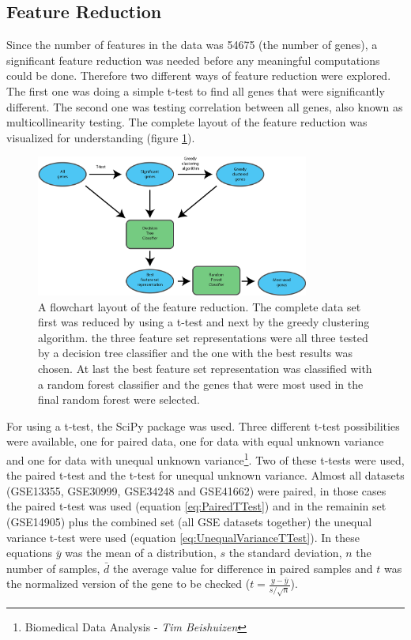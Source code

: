 \documentclass[10pt,a4paper]{article}
\begin{document}
	\subsection{Feature Reduction}
	\label{subsec:MethodsFeatureReduction}
	
	Since the number of features in the data was 54675 (the number of genes), a significant feature reduction was needed before any meaningful computations could be done. Therefore two different ways of feature reduction were explored. The first one was doing a simple t-test to find all genes that were significantly different. The second one was testing correlation between all genes, also known as multicollinearity testing. The complete layout of the feature reduction was visualized for understanding (figure \ref{fig:FeatureReductionLayout}).
	
	\begin{figure}[H]
		\includegraphics[width=0.8\textwidth]{FeatureReductionLayout.png}
		\caption{A flowchart layout of the feature reduction. The complete data set first was reduced by using a t-test and next by the greedy clustering algorithm. the three feature set representations were all three tested by a decision tree classifier and the one with the best results was chosen. At last the best feature set representation was classified with a random forest classifier and the genes that were most used in the final random forest were selected.}
		\label{fig:FeatureReductionLayout}
	\end{figure}
		
	
	For using a t-test, the SciPy package was used. Three different t-test possibilities were available, one for paired data, one for data with equal unknown variance and one for data with unequal unknown variance\footnote{\label{fn:BDA}Biomedical Data Analysis - \textit{Tim Beishuizen}}. Two of these t-tests were used, the paired t-test and the t-test for unequal unknown variance. Almost all datasets (GSE13355, GSE30999, GSE34248 and GSE41662) were paired, in those cases the paired t-test was used (equation \ref{eq:PairedTTest}) and in the remainin set (GSE14905) plus the combined set (all GSE datasets together) the unequal variance t-test were used (equation \ref{eq:UnequalVarianceTTest}). In these equations $\bar{y}$ was the mean of a distribution, $s$ the standard deviation, $n$ the number of samples, $\bar{d}$ the average value for difference in paired samples and $t$ was the normalized version of the gene to be checked ($t = \frac{y - \bar{y}}{s/\sqrt{n}}$).  
	
\end{document}
